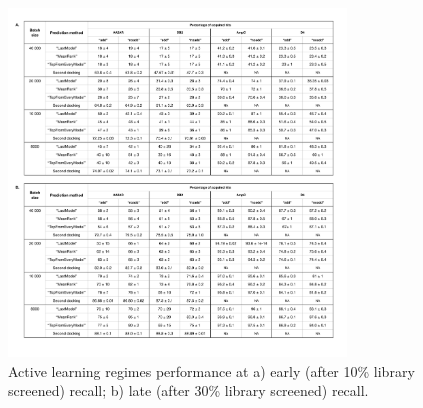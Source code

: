 \begin{figure}[h]
\centering
\includegraphics[width=0.8\textwidth]{tables/table_1_full.pdf}
\caption{Active learning regimes performance at a) early (after 10\% library screened) recall; b) late (after 30\% library screened) recall.}
\label{tab:tab_1}
\end{figure}
